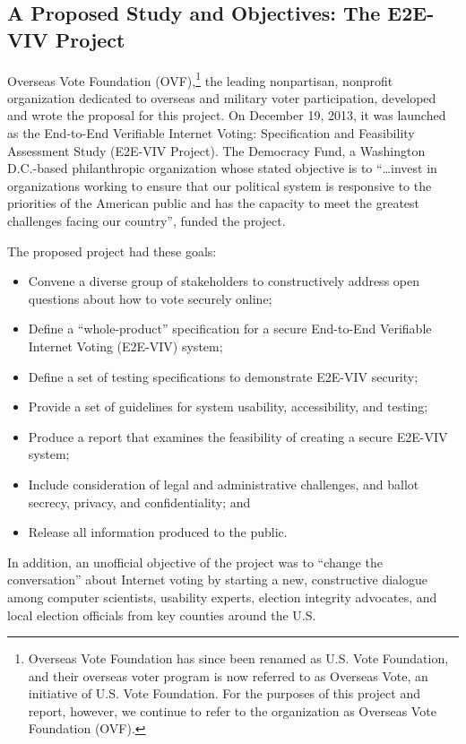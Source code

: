 \subsection*{A Proposed Study and Objectives: The E2E-VIV Project}
\label{sec:proposed-study-and-objectives}

Overseas Vote Foundation (OVF),\footnote{Overseas Vote Foundation has
  since been renamed as U.S. Vote Foundation, and their overseas voter
  program is now referred to as Overseas Vote, an initiative of
  U.S. Vote Foundation. For the purposes of this project and report,
  however, we continue to refer to the organization as Overseas Vote
  Foundation (OVF).} the leading nonpartisan, nonprofit organization
dedicated to overseas and military voter participation, developed and
wrote the proposal for this project. On December 19, 2013, it was
launched as the End-to-End Verifiable Internet Voting: Specification
and Feasibility Assessment Study (E2E-VIV Project). The Democracy
Fund, a Washington D.C.-based philanthropic organization whose stated
objective is to ``…invest in organizations working to ensure that our
political system is responsive to the priorities of the American
public and has the capacity to meet the greatest challenges facing our
country'', funded the project.

The proposed project had these goals:
\begin{itemize}
\item Convene a diverse group of stakeholders to constructively
  address open questions about how to vote securely online;
\item Define a ``whole-product'' specification for a secure End-to-End
  Verifiable Internet Voting (E2E-VIV) system;
\item Define a set of testing specifications to demonstrate E2E-VIV
  security;
\item Provide a set of guidelines for system usability, accessibility, and testing; 
\item Produce a report that examines the feasibility of creating a
  secure E2E-VIV system;
\item Include consideration of legal and administrative challenges,
  and ballot secrecy, privacy, and confidentiality; and
\item Release all information produced to the public. 
\end{itemize}

In addition, an unofficial objective of the project was to ``change
the conversation'' about Internet voting by starting a new,
constructive dialogue among computer scientists, usability experts,
election integrity advocates, and local election officials from key
counties around the U.S.

